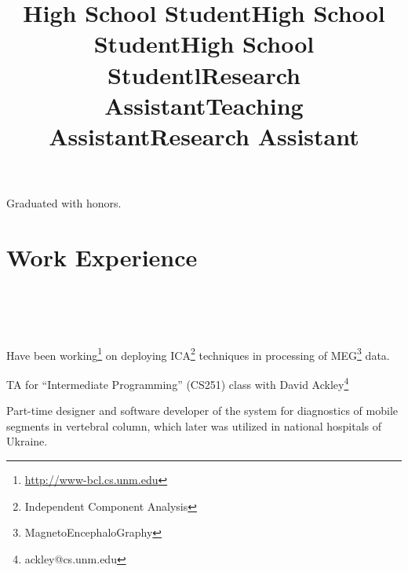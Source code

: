 \documentclass[10pt,overlapped,line]{res}
\begin{document}
\begin{resume}
\title{High School Student}
\begin{position}
 Graduated with honors.
\end{position}

\title{High School Student}
\begin{position}
\end{position}


\title{High School Student}
\begin{position}
\end{position}
 

\section{Work Experience}
\begin{format}
  \title{l}\\
  \\
  \body\\
\end{format}


\title{Research Assistant}
\begin{position}
 Have been working\footnote{\href{URL}{http://www-bcl.cs.unm.edu}} on deploying ICA\footnote{Independent Component Analysis} techniques in processing of
MEG\footnote{MagnetoEncephaloGraphy} data. 
\end{position}

\title{Teaching Assistant}
\begin{position}
  TA for ``Intermediate Programming'' (CS251) class with David
  Ackley\footnote{ackley@cs.unm.edu}
\end{position}


\title{Research Assistant}
\begin{position}
Part-time designer and software developer of the system for
diagnostics of mobile segments in vertebral column, which later was
utilized in national hospitals of Ukraine.
\end{position}


\end{resume}
\end{document}
